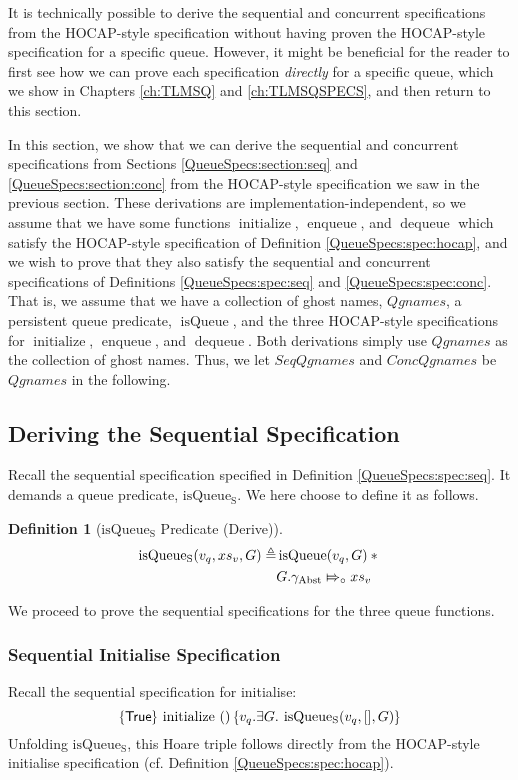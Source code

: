 \documentclass[a4paper, 10pt]{report}
\theoremstyle{definition}
\newtheorem{definition}{Definition}[section]
\newcommand{\initialise}{\operatorname{initialize}}
\newcommand{\enqueue}{\operatorname{enqueue}}
\newcommand{\dequeue}{\operatorname{dequeue}}
\newcommand{\isqueue}{\operatorname{isQueue}}
\newcommand{\isqueueseq}{\operatorname{isQueue_{S}}}
\newcommand{\SeqQgnames}{SeqQgnames}
\newcommand{\ConcQgnames}{ConcQgnames}
\newcommand{\Qgnames}{Qgnames}
\newcommand{\vq}{v_q}
\newcommand{\absvalueList}{xs_v}
\newcommand{\Qg}{G}
\newcommand{\gabst}{\gname_{\mathrm{Abst}}}
\newcommand{\abstractstatefullfrag}[2]{#1 \Mapsto_{\circ} #2}
\newcommand{\seqspecinitHTGen}[2]{\hoare{\TRUE}{\initialise \ \TT}{#1 . \Exists #2. \isqueueseq(#1, [], #2)}}
\newcommand{\seqspecinitGen}[2]{\seqspecinitHTGen{#1}{#2}}
\newcommand{\seqspecinit}{\seqspecinitGen{\vq}{\Qg}}
\begin{document}
It is technically possible to derive the sequential and concurrent specifications from the HOCAP-style specification without having proven the HOCAP-style specification for a specific queue. However, it might be beneficial for the reader to first see how we can prove each specification \textit{directly} for a specific queue, which we show in Chapters \ref{ch:TLMSQ} and \ref{ch:TLMSQSPECS}, and then return to this section.

In this section, we show that we can derive the sequential and concurrent specifications from Sections \ref{QueueSpecs:section:seq} and \ref{QueueSpecs:section:conc} from the HOCAP-style specification we saw in the previous section. These derivations are implementation-independent, so we assume that we have some functions $\initialise$, $\enqueue$, and $\dequeue$ which satisfy the HOCAP-style specification of Definition \ref{QueueSpecs:spec:hocap}, and we wish to prove that they also satisfy the sequential and concurrent specifications of Definitions \ref{QueueSpecs:spec:seq} and \ref{QueueSpecs:spec:conc}. That is, we assume that we have a collection of ghost names, $\Qgnames$, a persistent queue predicate, $\isqueue$, and the three HOCAP-style specifications for $\initialise$, $\enqueue$, and $\dequeue$. Both derivations simply use $\Qgnames$ as the collection of ghost names. Thus, we let $\SeqQgnames$ and $\ConcQgnames$ be $\Qgnames$ in the following.

\subsection{Deriving the Sequential Specification}
\label{QueueSpecs:deriving-seq-and-conc:sub:seq}

Recall the sequential specification specified in Definition \ref{QueueSpecs:spec:seq}. It demands a queue predicate, $\isqueueseq$. We here choose to define it as follows.
\begin{definition}[$\isqueueseq$ Predicate (Derive)]\label{QueueSpecs:spec:seq:isqueueseq_derive}
\begin{align*}
  \isqueueseq(\vq, \absvalueList, \Qg) \eqdef
    &\isqueue(\vq, \Qg) \star{}\\
    &\abstractstatefullfrag{\Qg.\gabst}{\absvalueList}
\end{align*}
\end{definition}
We proceed to prove the sequential specifications for the three queue functions.

\subsubsection{Sequential Initialise Specification}
Recall the sequential specification for initialise:
\begin{equation*}
  \seqspecinit
\end{equation*}
Unfolding $\isqueueseq$, this Hoare triple follows directly from the HOCAP-style initialise specification (cf. Definition \ref{QueueSpecs:spec:hocap}).
\end{document}
